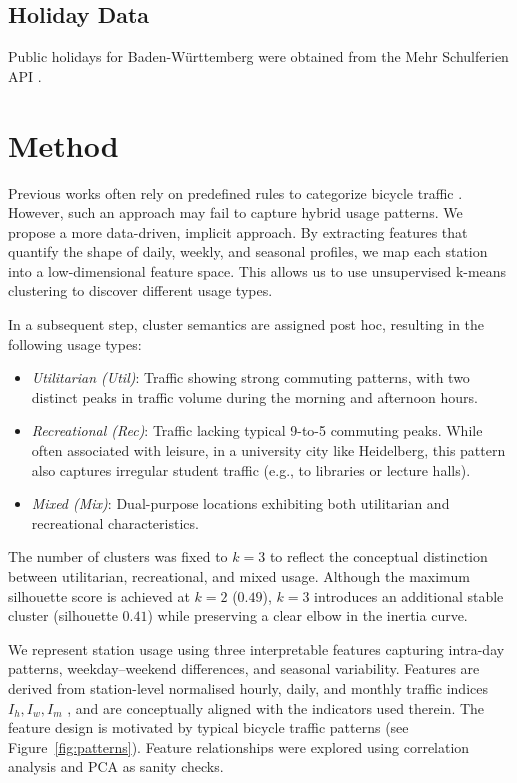 \documentclass{article}
\begin{document}
\subsection{Holiday Data}
Public holidays for Baden-Württemberg were obtained from the Mehr Schulferien API \cite{mehr_schulferien}. 

\section{Method}\label{sec:methods}
Previous works often rely on predefined rules to categorize bicycle traffic \citep{american_bike_patterns}. However, such an approach may fail to capture hybrid usage patterns.
We propose a more data-driven, implicit approach. By extracting features that quantify the shape of daily, weekly, and seasonal profiles,
we map each station into a low-dimensional feature space. This allows us to use unsupervised k-means clustering \citep{kmeans} to discover different usage types. 

In a subsequent step, cluster semantics are assigned post hoc, resulting in the following usage types:
\begin{itemize}[noitemsep, topsep=1pt]
    \item \emph{Utilitarian (Util)}: Traffic showing strong commuting patterns, with two distinct peaks in traffic volume during the morning and afternoon hours.
    \item \emph{Recreational (Rec)}: Traffic lacking typical 9-to-5 commuting peaks. While often associated with leisure, in a university city like Heidelberg, this pattern also captures irregular student traffic (e.g., to libraries or lecture halls).
    \item \emph{Mixed (Mix)}: Dual-purpose locations exhibiting both utilitarian and recreational characteristics.
\end{itemize}

The number of clusters was fixed to $k=3$ to reflect the conceptual distinction between utilitarian, recreational, and mixed usage.
Although the maximum silhouette score is achieved at $k=2$ ($0.49$), 
$k=3$ introduces an additional stable cluster (silhouette $0.41$) while preserving a clear elbow in the inertia curve.

We represent station usage using three interpretable features capturing intra-day patterns, weekday–weekend differences, and seasonal variability. 
Features are derived from station-level normalised hourly, daily, and monthly traffic indices $I_h, I_w, I_m$ \cite{american_bike_patterns}, and are conceptually aligned with the indicators used therein. The feature design is motivated by typical bicycle traffic patterns (see Figure~\ref{fig:patterns}). 
Feature relationships were explored using correlation analysis and PCA as sanity checks.
\end{document}
